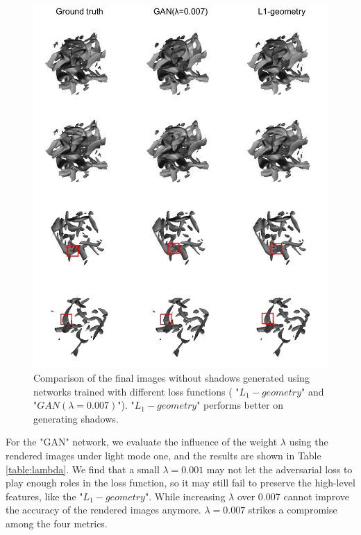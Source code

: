 \documentclass[journal]{vgtc}                %
\begin{document}
\begin{figure}
  \centering
  \includegraphics[width=1\linewidth]{lossws}
  \caption{Comparison of the final images without shadows generated using networks trained with different loss functions (  "$L_1-geometry$" and "$GAN(\lambda=0.007)$"). "$L_1-geometry$" performs better on generating shadows. }
  \label{fig:lossws}
\end{figure}

For the "GAN" network, we evaluate the influence of the weight $\lambda$ using the rendered images under light mode one, and the results are shown in Table \ref{table:lambda}. We find that a small $\lambda=0.001$ may not let the adversarial loss to play enough roles in the loss function, so it may still fail to preserve the high-level features, like the "$L_1-geometry$". While increasing $\lambda$ over 0.007 cannot improve the accuracy of the rendered images anymore. $\lambda=0.007$ strikes a compromise among the four metrics. 
\end{document}
